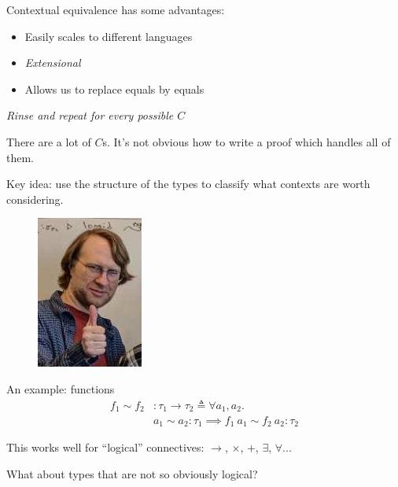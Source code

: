 \documentclass{beamer}
\newcommand{\fn}[2]{\ensuremath{#1 \to #2}}
\newcommand{\ap}[2]{\ensuremath{#1\ #2}}
\begin{document}
\begin{frame}
  Contextual equivalence has some advantages:
  \begin{itemize}
  \item Easily scales to different languages
  \item \emph{Extensional}
  \item Allows us to replace equals by equals
  \end{itemize}
\end{frame}

\begin{frame}
  \begin{center}
    \it Rinse and repeat for every possible $C$
  \end{center}
  \pause
  There are a lot of $C$s.
  \pause
  It's not obvious how to write a proof which handles all of them.
\end{frame}

\begin{frame}
  \centering
  Key idea: use {\color<2>{PaleGray} the structure of the} types
  { to classify what contexts are worth considering.}
  \pause
  \bigskip

  \begin{figure}
    \includegraphics[height=5cm,keepaspectratio]{happy-karl}
  \end{figure}
\end{frame}

\begin{frame}
  \centering
  An example: functions
  \pause
  \bigskip
  \begin{align*}
    f_1 \sim f_2 &: \fn{\tau_1}{\tau_2} \triangleq \forall a_1, a_2.\\
    &a_1 \sim a_2 : \tau_1 \implies \ap{f_1}{a_1} \sim \ap{f_2}{a_2} : \tau_2
  \end{align*}
\end{frame}

\begin{frame}
  This works well for ``logical'' connectives: $\to$, $\times$, $+$,
  $\exists$, $\forall$...
  \pause

  What about types that are not so obviously logical?
\end{frame}
\end{document}

